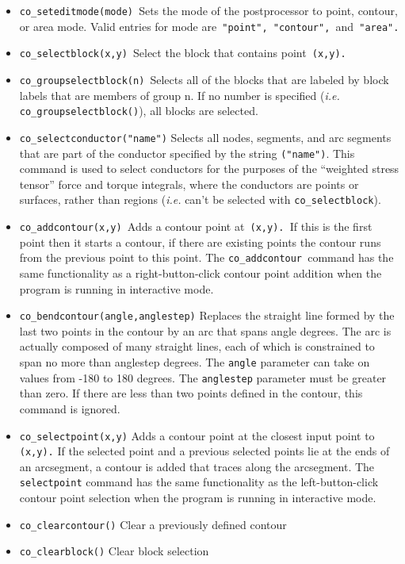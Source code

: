 \begin{itemize}
\item \texttt{co\_seteditmode(mode) }Sets the mode of the postprocessor to point,
contour, or area mode. Valid entries for mode are\texttt{ "point",
"contour", }and\texttt{ "area". }

\item \texttt{co\_selectblock(x,y) }Select the block that contains point\texttt{
(x,y).}

\item \texttt{co\_groupselectblock(n) }Selects all of the blocks that are labeled by
block labels that are members of group n. If no number is specified
({\em i.e.} \texttt{co\_groupselectblock()}), all blocks are selected.

\item \texttt{co\_selectconductor("name")} Selects all nodes, segments, and arc
segments that are part of the conductor specified by the string
\texttt{("name")}. This command is used to select conductors for the
purposes of the ``weighted stress tensor'' force and torque
integrals, where the conductors are points or surfaces, rather than
regions ({\em i.e.} can't be selected with \texttt{co\_selectblock}).

\item \texttt{co\_addcontour(x,y) }Adds a contour point at\texttt{ (x,y). }If this is
the first point then it starts a contour, if there are existing
points the contour runs from the previous point to this point. The
\texttt{co\_addcontour }command has the same functionality as a
right-button-click contour point addition when the program is
running in interactive mode.\texttt{ }

\item \texttt{co\_bendcontour(angle,anglestep)} Replaces the straight line formed by
the last two points in the contour by an arc that spans angle
degrees. The arc is actually composed of many straight lines, each
of which is constrained to span no more than anglestep degrees. The
\texttt{angle} parameter can take on values from -180 to 180
degrees. The \texttt{anglestep} parameter must be greater than
zero. If there are less than two points defined in the contour,
this command is ignored.

\item \texttt{co\_selectpoint(x,y)} Adds a contour point at the closest input point to
\texttt{(x,y).} If the selected point and a previous selected points lie at
the ends of an arcsegment, a contour is added that traces along the
arcsegment. The \texttt{selectpoint} command has the same
functionality as the left-button-click contour point selection when
the program is running in interactive mode.

\item \texttt{co\_clearcontour()} Clear a previously defined contour

\item \texttt{co\_clearblock()} Clear block selection
\end{itemize}



